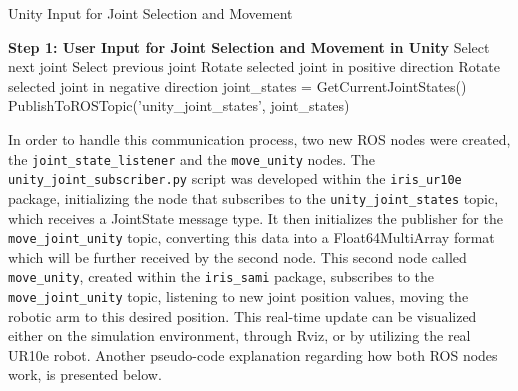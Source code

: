 \begin{algorithm}
    \caption{Unity Input for Joint Selection and Movement}\label{alg:unity_input}
    \begin{algorithmic}[1]
        \State \textbf{Step 1: User Input for Joint Selection and Movement in Unity}
                \State Select next joint
                \State Select previous joint
            \EndIf
                \State Rotate selected joint in positive direction
                \State Rotate selected joint in negative direction
            \EndIf
                \State joint\_states = GetCurrentJointStates()
                \State PublishToROSTopic('unity\_joint\_states', joint\_states)
            \EndIf
        \EndWhile
    \end{algorithmic}
\end{algorithm}


In order to handle this communication process, two new \ac{ROS} nodes were created, the \texttt{joint\_state\_listener} and the \texttt{move\_unity} nodes. The \texttt{unity\_joint\_subscriber.py} script was developed within the \texttt{iris\_ur10e} package, initializing the node that subscribes to the \texttt{unity\_joint\_states} topic, which receives a JointState message type. It then initializes the publisher for the \texttt{move\_joint\_unity} topic, converting this data into a Float64MultiArray format which will be further received by the second node. This second node called \texttt{move\_unity}, created within the \texttt{iris\_sami} package, subscribes to the \texttt{move\_joint\_unity} topic, listening to new joint position values, moving the robotic arm to this desired position. This real-time update can be visualized either on the simulation environment, through Rviz, or by utilizing the real UR10e robot. Another pseudo-code explanation regarding how both \ac{ROS} nodes work, is presented below.


